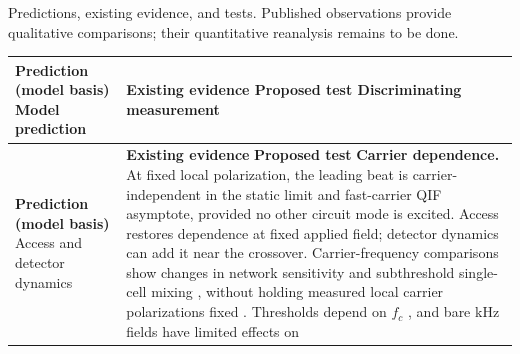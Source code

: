\documentclass[11pt,a4paper]{article}
\providecommand{\DIFaddtex}[1]{{\protect\color{blue} \sf #1}} %
\providecommand{\DIFdeltex}[1]{{\protect\color{red} \scriptsize #1}} %
\providecommand{\DIFaddFL}[1]{\DIFadd{#1}} %
\providecommand{\DIFdelFL}[1]{\DIFdel{#1}} %
\providecommand{\DIFaddbeginFL}{} %
\providecommand{\DIFaddendFL}{} %
\providecommand{\DIFdelbeginFL}{} %
\providecommand{\DIFdelendFL}{} %
\providecommand{\DIFadd}[1]{\texorpdfstring{\DIFaddtex{#1}}{#1}} %
\providecommand{\DIFdel}[1]{\texorpdfstring{\DIFdeltex{#1}}{}} %
\begin{document}
\begin{table}[htbp]
\centering\DIFaddendFL \small
\renewcommand{\arraystretch}{1.15}
\DIFdelbeginFL %
{%
\DIFdelFL{Predictions, existing evidence, and tests. Published observations provide
qualitative comparisons; their quantitative reanalysis remains to be done.}}
\DIFdelendFL \DIFaddbeginFL \begin{tabular}{@{}>{\raggedright\arraybackslash}p{}
 >{\raggedright\arraybackslash}p{}@{}}
\DIFaddendFL \toprule
\DIFdelbeginFL \DIFdelFL{\textbf{Prediction (model basis)} }\DIFdelendFL \DIFaddbeginFL \DIFaddFL{Model prediction }\DIFaddendFL & \DIFdelbeginFL \DIFdelFL{\textbf{Existing evidence} }%
\DIFdelFL{\textbf{Proposed test} }\DIFdelendFL \DIFaddbeginFL \DIFaddFL{Discriminating measurement }\DIFaddendFL \\
\midrule
\DIFdelbeginFL %
\DIFdelFL{\textbf{Prediction (model basis)} }\DIFdelendFL \DIFaddbeginFL \DIFaddFL{Access and detector dynamics }\DIFaddendFL & \DIFdelbeginFL \DIFdelFL{\textbf{Existing evidence} }%
\DIFdelFL{\textbf{Proposed test} }%
\DIFdelFL{\textbf{Carrier dependence.} At fixed local polarization, the leading beat is
carrier-independent in the
static limit and fast-carrier QIF asymptote, provided
no other circuit mode is excited. Access restores dependence at fixed applied
field; detector dynamics can add it near the crossover.
}%
\DIFdelFL{Carrier-frequency comparisons show changes in network sensitivity
\cite{esmaeilpour2021} and subthreshold single-cell mixing \cite{luff2024mixer},
without holding measured local carrier polarizations fixed
. Thresholds depend on $f_c$
\cite{opancar2025,peripheral2023}, and bare kHz fields have limited effects on
}
\end{tabular}
\end{table}
\end{document}
